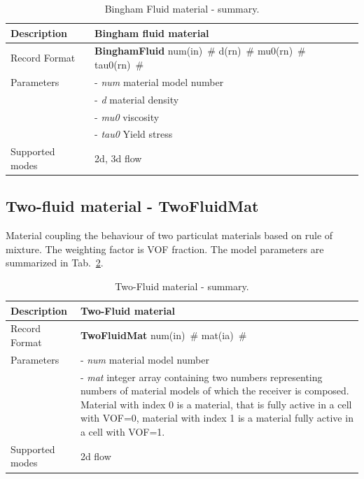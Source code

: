 \documentclass[a4paper]{article}
\newcommand{\descitem}[1]{{\noindent \bf #1}}
\newcommand{\elemparam}[2]{{{#1\tiny (#2)}~\#}}
\newcommand{\param}[1]{{\it #1}}
\begin{document}
\begin{table}[!htb]
\begin{tabular}{|l|p{9cm}|}
\hline
Description & Bingham fluid material\\
\hline
Record Format & \descitem{BinghamFluid} \elemparam{num}{in}
\elemparam{d}{rn} \elemparam{mu0}{rn} \elemparam{tau0}{rn}\\
Parameters &- \param{num} material model number\\
&- \param{d} material density\\
&- \param{mu0} viscosity\\
&- \param{tau0} Yield stress\\
Supported modes& 2d, 3d flow\\
\hline
\end{tabular}
\caption{Bingham Fluid material - summary.}
\label{BinghamFluidMaterial_table}
\end{table}



\subsection{Two-fluid material - TwoFluidMat}
\label{TwoFluidMaterial}
Material coupling the behaviour of two particulat materials based on
rule of mixture. The weighting factor is VOF fraction.
The model parameters are summarized in Tab.~\ref{TwoFluidMaterial_table}.

\begin{table}[!htb]
\begin{tabular}{|l|p{9cm}|}
\hline
Description & Two-Fluid material\\
\hline
Record Format & \descitem{TwoFluidMat} \elemparam{num}{in}
\elemparam{mat}{ia}\\
Parameters &- \param{num} material model number\\
&- \param{mat} integer array containing two numbers representing
numbers of material models of which the receiver is composed. Material
with index 0 is a material, that is fully active in a cell with VOF=0,
material with index 1 is a material fully active in a cell with VOF=1.\\
Supported modes& 2d flow\\
\hline
\end{tabular}
\caption{Two-Fluid material - summary.}
\label{TwoFluidMaterial_table}
\end{table}
\end{document}
